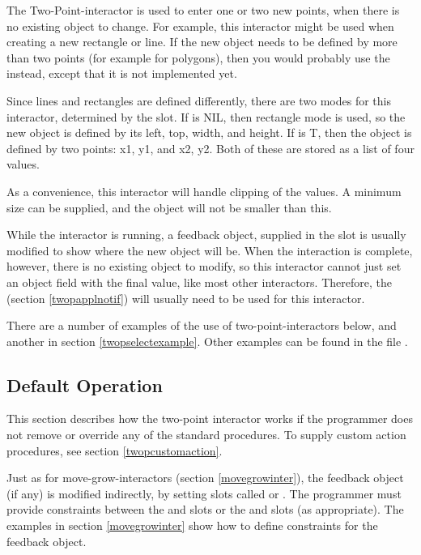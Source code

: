 The Two-Point-interactor is used to enter one or two new points, when there
is no existing object to change.  For example, this interactor might be
used when creating a new rectangle or line.  If the new object needs to be
defined by more than two points (for example for polygons), then you would
probably use the  instead, except that
it is not implemented yet.

Since lines and rectangles are defined differently, there are two modes for
this interactor, determined by the  slot.  If  is NIL, then
rectangle mode is used, so the new object is defined by its left, top, width,
and height.  If  is T, then the object is defined by two
points: x1, y1, and x2, y2.  Both of these are stored as a list of four values.

As a convenience, this interactor will handle clipping of the values.  A
minimum size can be supplied, and the object will not be smaller than this.

While the interactor is running, a feedback object, supplied in the
 slot is usually modified to show where the new object
will be.  When the interaction is complete, however,
there is no existing object to modify, so this interactor cannot just
set an object field with the final value, like most other interactors.
Therefore, the  (section \ref{twopapplnotif}) will
usually need to be used for this interactor.

There are a number of examples of the use of two-point-interactors below,
and another in section \ref{twopselectexample}.  Other
examples can be found in the file .

\subsection{Default Operation}

This section describes how the two-point interactor works
if the programmer does not remove or override any of the standard
 procedures.  To supply custom action procedures, see section
\ref{twopcustomaction}.

Just as for move-grow-interactors (section \ref{movegrowinter}),
the feedback object (if any) is modified indirectly, by setting slots called
 or .  The programmer must provide constraints between
the  and  slots or the  and  slots (as appropriate).  The examples in section
\ref{movegrowinter} show how to define constraints for the feedback object.

